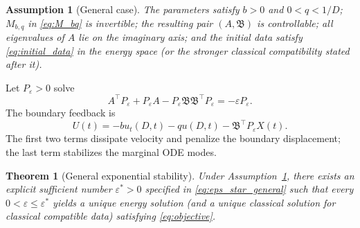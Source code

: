 \documentclass[journal]{IEEEtran}
\newtheorem{theorem}{Theorem}
\newtheorem{assumption}{Assumption}
\newcommand{\eps}{\varepsilon}
\newcommand{\Bcal}{\mathfrak B}
\begin{document}
\begin{assumption}[General case]\label{ass:general}
The parameters satisfy \(b>0\) and \(0<q<1/D\); \(M_{b,q}\) in \eqref{eq:M_bq} is invertible; the resulting pair \((A,\Bcal)\) is controllable; all eigenvalues of \(A\) lie on the imaginary axis; and the initial data satisfy \eqref{eq:initial_data} in the energy space (or the stronger classical compatibility stated after it).
\end{assumption}

Let \(P_\eps>0\) solve
\begin{equation}
 A^\top P_\eps+P_\eps A-P_\eps\Bcal\Bcal^\top P_\eps=-\eps P_\eps. \label{eq:ARE_general}
\end{equation}
The boundary feedback is
\begin{equation}
 U(t)=-b u_t(D,t)-q u(D,t)-\Bcal^\top P_\eps X(t). \label{eq:controller_general}
\end{equation}
The first two terms dissipate velocity and penalize the boundary displacement; the last term stabilizes the marginal ODE modes.

\begin{theorem}[General exponential stability]\label{thm:general}
Under Assumption~\ref{ass:general}, there exists an explicit sufficient number \(\eps^*>0\) specified in \eqref{eq:eps_star_general} such that every \(0<\eps\leq\eps^*\) yields a unique energy solution (and a unique classical solution for classical compatible data) satisfying \eqref{eq:objective}.
\end{theorem}
\end{document}
